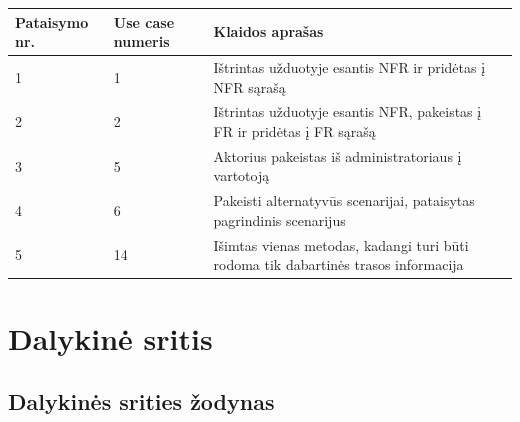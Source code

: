 \documentclass[oneside]{VUMIFPSkursinis}
\begin{document}
\begin{longtable}{ | p{}|p{}|p{}| }  \hline
	Pataisymo nr. & Use case numeris & Klaidos aprašas \\ \hline
	1 & 1 & Ištrintas užduotyje esantis NFR ir pridėtas į NFR sąrašą\\ \hline
	2 & 2 & Ištrintas užduotyje esantis NFR, pakeistas į FR ir pridėtas į FR sąrašą\\ \hline
	3 & 5 & Aktorius pakeistas iš administratoriaus į vartotoją\\ \hline
	4 & 6 & Pakeisti alternatyvūs scenarijai, pataisytas pagrindinis scenarijus\\ \hline
	5 & 14 & Išimtas vienas metodas, kadangi turi būti rodoma tik dabartinės trasos informacija\\ \hline
\end{longtable}


\section{Dalykinė sritis}
\subsection{Dalykinės srities žodynas}
\end{document}
